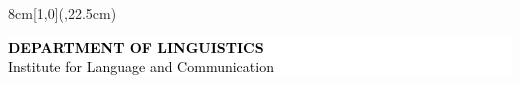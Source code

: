 \documentclass[a4paper,12pt,leqno,openbib,oneside,reqno]{memoir}
\begin{document}
\begin{textblock*}{8cm}[1,0](\paperwidth,22.5cm)
\colorbox{white}{%
\begin{minipage}{8cm}
\vspace{0.4cm}
\hspace{0.5cm}
\begin{minipage}{7cm}
\raggedright
\begin{center}
\textcolor{black}{\fontsize{14}{17}\selectfont\bfseries DEPARTMENT OF LINGUISTICS}\\[0.2cm]
\textcolor{black}{\fontsize{11}{13}\selectfont Institute for Language and Communication}
\end{center}
\end{minipage}
\vspace{0.4cm}
\end{minipage}
}
\end{textblock*}

\vfill

\newpage
\pagecolor{white}
\clearpage


\renewcommand{\contentsname}{Table of Contents}
\hypersetup{linkcolor=tocgray}  %
\tableofcontents*
\hypersetup{linkcolor=emblemcolor}  %
\clearpage

\mainmatter










\backmatter
{}

\setlength{\bibhang}{0pt}

\printbibliography[title=Bibliography]
\clearpage
\end{document}
